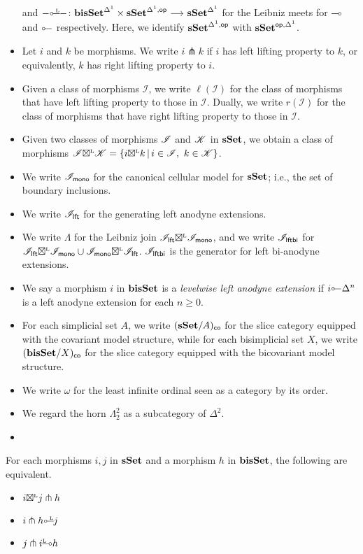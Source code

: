 \documentclass[a4paper,  dvipsnames, 11pt]{amsart}
\begin{document}
\begin{notation}
\begin{itemize}
			and
			$-\lollipopL-\colon\bisSet^\ra\times\sSet^{\ra,\op}\arr\sSet^\ra$
			for the Leibniz meets for $\rollipop$ and $\lollipop$ respectively.
			Here, we identify $\mathbf{sSet}^{{\Delta^1},\mathsf{op}}$ with $\mathbf{sSet}^{\mathsf{op},{\Delta^1}}$.
		\item %
			Let $i$ and $k$ be morphisms.
			We write $i\pitchfork k$ if $i$ has left lifting property to $k$, or equivalently,
			$k$ has right lifting property to $i$.
		\item
			Given a class of morphisms $\mathscr{I}$,
			we write $\ell(\mathscr{I})$ for the class of morphisms that have left lifting property to those in $\mathscr{I}$.
			Dually, we write $r(\mathscr{I})$ for the class of morphisms that have right lifting property to those in $\mathscr{I}$.
		\item %
			Given two classes of morphisms $\mathscr{I}$ and $\mathscr{K}$ in $\mathbf{sSet}$,
			we obtain a class of morphisms $\mathscr{I}{\mathrel{\boxtimes^{\text{\tiny{L}}}}}\mathscr{K}=\{ i{\mathrel{\boxtimes^{\text{\tiny{L}}}}} k\,|\,i\in\mathscr{I},\ k\in\mathscr{K} \}$.
		\item %
			We write $\mathscr{I}_{\mathsf{mono}}$ for the canonical cellular model for $\mathbf{sSet}$; i.e., the set of boundary inclusions.
		\item %
			We write $\mathscr{I}_{\mathsf{lft}}$ for the generating left anodyne extensions.
		\item %
			We write $\Lambda$ for the Leibniz join $\mathscr{I}_{\mathsf{lft}}{\mathrel{\boxtimes^{\text{\tiny{L}}}}}\mathscr{I}_{\mathsf{mono}}$,
			and we write $\mathscr{I}_{\mathsf{lftbi}}$ for $\mathscr{I}_{\mathsf{lft}}{\mathrel{\boxtimes^{\text{\tiny{L}}}}}\mathscr{I}_{\mathsf{mono}}\cup\mathscr{I}_{\mathsf{mono}}{\mathrel{\boxtimes^{\text{\tiny{L}}}}}\mathscr{I}_{\mathsf{lft}}$.
			$\mathscr{I}_{\mathsf{lftbi}}$ is the generator for left bi-anodyne extensions.
		\item %
			We say a morphism $i$ in $\mathbf{bisSet}$ 
			is a \emph{levelwise left anodyne extension} if
			$i\lollipop \Delta^n$ is a left anodyne extension for each $n\geq 0$.
		\item %
			For each simplicial set $A$,
			we write $(\mathbf{sSet}/A)_{\mathsf{co}}$ for the slice category equipped with the covariant model structure,
			while for each bisimplicial set $X$,
			we write $(\mathbf{bisSet}/X)_{\mathsf{co}}$ for the slice category equipped with the bicovariant model structure.
		\item %
			We write $\omega$ for the least infinite ordinal seen as a category by its order.
		\item %
			We regard the horn $\Lambda^2_2$ as a subcategory of $\Delta^2$.
		\item %
		\qedhere %
	\end{itemize}
\end{notation}
\begin{lemma}
	\label{lem:pitchfork}
	For each morphisms $i,j$ in $\mathbf{sSet}$ and a morphism $h$ in $\mathbf{bisSet}$, the following are equivalent.
	\begin{itemize}
		\item %
			$i{\mathrel{\boxtimes^{\text{\tiny{L}}}}} j\pitchfork h$
		\item %
			$i\pitchfork h\lollipopL j$
		\item %
			$j\pitchfork i\rollipopL h$
	\end{itemize}
\end{lemma}
\end{document}
